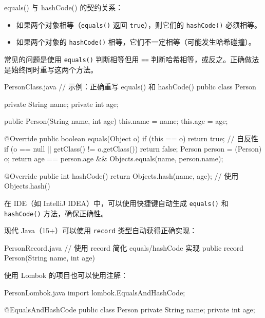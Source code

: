 equals() 与 hashCode() 的契约关系：
\begin{itemize}
    \item 如果两个对象相等（\texttt{equals()} 返回 \texttt{true}），则它们的 \texttt{hashCode()} 必须相等。
    \item 如果两个对象的 \texttt{hashCode()} 相等，它们不一定相等（可能发生哈希碰撞）。
\end{itemize}


常见的问题是使用 \texttt{equals()} 判断相等但用 \texttt{==} 判断哈希相等，或反之。正确做法是始终同时重写这两个方法。


\begin{codeblock}[Java]{PersonClass.java}
// 示例：正确重写 equals() 和 hashCode()
public class Person {
    private String name;
    private int age;

    public Person(String name, int age) {
        this.name = name;
        this.age = age;
    }

    @Override
    public boolean equals(Object o) {
        if (this == o) return true;           // 自反性
        if (o == null || getClass() != o.getClass()) return false;
        Person person = (Person) o;
        return age == person.age &&
               Objects.equals(name, person.name);
    }

    @Override
    public int hashCode() {
        return Objects.hash(name, age);      // 使用 Objects.hash()
    }
}
\end{codeblock}

在 IDE（如 IntelliJ IDEA）中，可以使用快捷键自动生成 \texttt{equals()} 和 \texttt{hashCode()} 方法，确保正确性。

现代 Java（15+）可以使用 \texttt{record} 类型自动获得正确实现：

\begin{codeblock}[Java]{PersonRecord.java}
// 使用 record 简化 equals/hashCode 实现
public record Person(String name, int age) {}
\end{codeblock}

使用 Lombok 的项目也可以使用注解：

\begin{codeblock}[Java]{PersonLombok.java}
import lombok.EqualsAndHashCode;

@EqualsAndHashCode
public class Person {
    private String name;
    private int age;
}
\end{codeblock}

